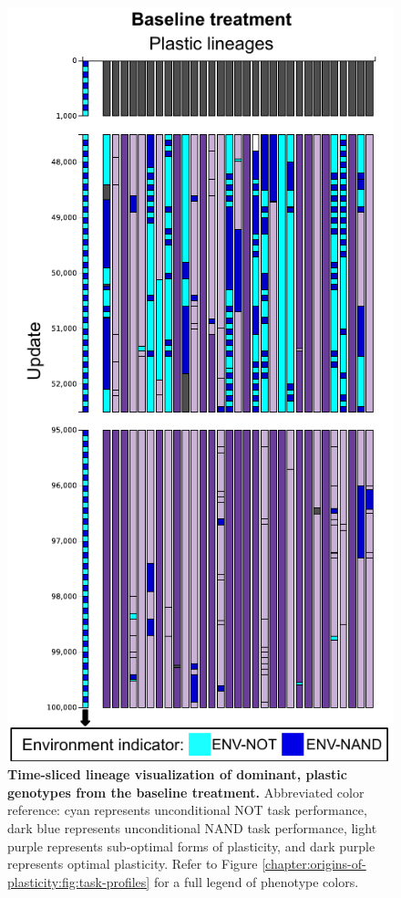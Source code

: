 \begin{figure}[!ht]
  \centering
  \includegraphics[height=0.65\textheight, keepaspectratio]{chapters/02-evolutionary-origins-of-plasticity/media/baseline-plastic-lineages.pdf}
  \caption{\small 
  \textbf{Time-sliced lineage visualization of dominant, plastic genotypes from the baseline treatment.}
  Abbreviated color reference: 
  cyan represents unconditional NOT task performance, 
  dark blue represents unconditional NAND task performance, 
  light purple represents sub-optimal forms of plasticity, 
  and dark purple represents optimal plasticity.  
  Refer to Figure \ref{chapter:origins-of-plasticity:fig:task-profiles} for a full legend of phenotype colors.}
  \label{chapter:origins-of-plasticity:fig:baseline-lineages}
\end{figure}